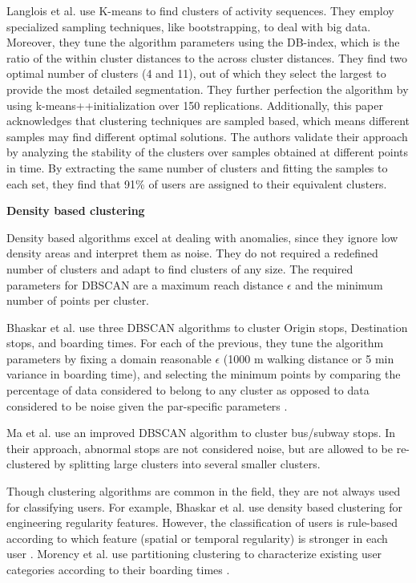 \documentclass{article}
\begin{document}
Langlois et al. use K-means to find clusters of activity sequences. They employ specialized sampling techniques, like bootstrapping, to deal with big data.  Moreover, they tune the algorithm parameters using the DB-index, which is the ratio of the within cluster distances to the across cluster distances. They find two optimal number of clusters (4 and 11), out of which they select the largest to provide the most detailed segmentation. They further perfection the algorithm by using k-means++initialization over 150 replications. Additionally, this paper acknowledges that clustering techniques are sampled based, which means different samples may find different optimal solutions. The authors validate their approach by analyzing the stability of the clusters over samples obtained at different points in time. By extracting the same number of clusters and fitting the samples to each set, they find that 91\% of users are assigned to their equivalent clusters. \cite{langlois2016inferring}

\textbf{Density based clustering}

Density based algorithms excel at dealing with anomalies, since they ignore low density areas and interpret them as noise. They do not required a redefined number of clusters and adapt to find clusters of any size. The required parameters for DBSCAN are a maximum reach distance $\epsilon$ and the minimum number of points per cluster.

Bhaskar et al. use three DBSCAN algorithms to cluster Origin stops, Destination stops, and boarding times. For each of the previous, they tune the algorithm parameters by fixing a domain reasonable $\epsilon$ (1000 m walking distance or 5 min variance in boarding time), and selecting the minimum points by comparing the percentage of data considered to belong to any cluster as opposed to data considered to be noise given the par-specific parameters \cite{bhaskar2015passenger}. 

Ma et al. use an improved DBSCAN algorithm to cluster bus/subway stops. In their approach, abnormal stops are not considered noise, but are allowed to be re-clustered by splitting large clusters into several smaller clusters. 

Though clustering algorithms are common in the field, they are not always used for classifying users. For example, Bhaskar et al. use density based clustering for engineering regularity features. However, the classification of users is rule-based according to which feature (spatial or temporal regularity) is stronger in each user \cite{bhaskar2015passenger}. Morency et al. use partitioning clustering to characterize existing user categories according to their boarding times \cite{morency2007measuring}. 
\end{document}
